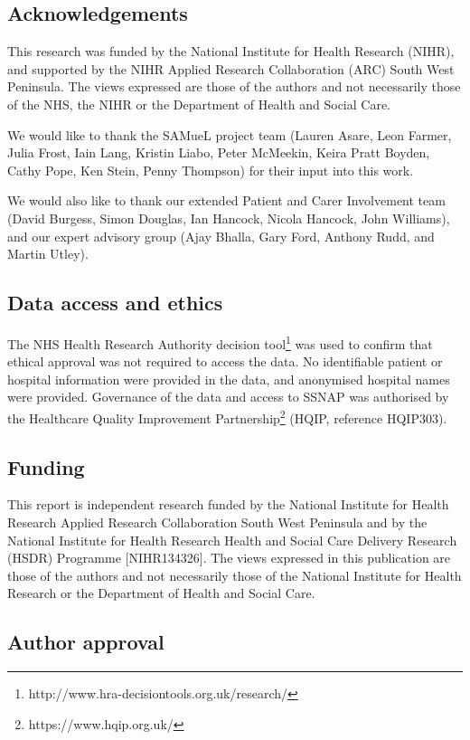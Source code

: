 \subsection*{Acknowledgements}

This research was funded by the National Institute for Health Research (NIHR), and supported by the NIHR Applied Research Collaboration (ARC) South West Peninsula. The views expressed are those of the authors and not necessarily those of the NHS, the NIHR or the Department of Health and Social Care.

We would like to thank the SAMueL project team (Lauren Asare, Leon Farmer, Julia Frost,  Iain Lang, Kristin Liabo, Peter McMeekin, Keira Pratt Boyden, Cathy Pope, Ken Stein, Penny Thompson) for their input into this work.

We would also like to thank our extended Patient and Carer Involvement team (David Burgess, Simon Douglas, Ian Hancock, Nicola Hancock, John Williams), and our expert advisory group (Ajay Bhalla, Gary Ford, Anthony Rudd, and Martin Utley).

\subsection*{Data access and ethics}

The NHS Health Research Authority decision tool\footnote{http://www.hra-decisiontools.org.uk/research/} was used to confirm that ethical approval was not required to access the data. No identifiable patient or hospital information were provided in the data, and anonymised hospital names were provided. Governance of the data and access to SSNAP was authorised by the Healthcare Quality Improvement Partnership\footnote{https://www.hqip.org.uk/} (HQIP, reference HQIP303). 

\subsection*{Funding}

This report is independent research funded by the National Institute for Health Research Applied Research Collaboration South West Peninsula and by the National Institute for Health Research Health and Social Care Delivery Research (HSDR) Programme [NIHR134326]. The views expressed in this publication are those of the authors and not necessarily those of the National Institute for Health Research or the Department of Health and Social Care.

\subsection*{Author approval}

